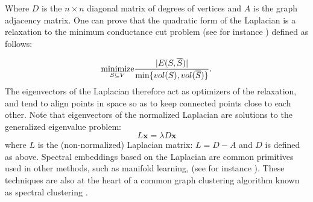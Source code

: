 Where $D$ is the $n \times n$ diagonal matrix of degrees of vertices and $A$ is the graph adjacency matrix. One can prove that the quadratic form of the Laplacian is a relaxation to the minimum conductance cut problem (see for instance \cite{chung1997spectral}) defined as follows:

\[
    \underset{S  \subseteq V }{\text{minimize}} {|E(S,\overline{S})|\over \min\{vol(S), vol(\overline{S})\}}.
\]
The eigenvectors of the Laplacian therefore act as optimizers of the relaxation, and tend to align points in space so as to keep connected points close to each other. Note that eigenvectors of the normalized Laplacian are solutions to the generalized eigenvalue problem:
\[
    L\mathbf{x} = \lambda D\mathbf{x}
\]
where $L$ is the (non-normalized) Laplacian matrix: $L = D-A$ and $D$ is defined as above. Spectral embeddings based on the Laplacian are common primitives used in other methods, such as manifold learning, (see for instance \cite{belkin2003laplacian}). These techniques are also at the heart of a common graph clustering algorithm known as spectral clustering \cite{ng2002spectral}.

\iffalse
\subsubsection*{Isomap}
Isomap is a method for manifold learning / non-linear dimensionality reduction. In a general setting, given data points living in a (non-linear) manifold in $\mathbb{R}^n$ we would like to embed them into lower dimensional space while preserving geodesic distances.
\fi
